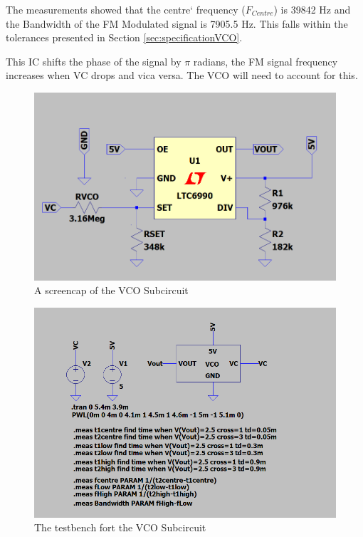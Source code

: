 The measurements showed that the centre` frequency ($F_{Centre}$) is 39842 Hz and the Bandwidth of the FM Modulated signal is 7905.5 Hz.
This falls within the tolerances presented in Section \ref{sec:specificationVCO}.

This IC shifts the phase of the signal by $\pi$ radians, the FM signal frequency increases when VC drops and vica versa. 
The VCO will need to account for this. 

\begin{figure}[H]
    \centering 
    \includegraphics[width=\textwidth]{../Circuits/Images/VCO/Schematic}
    \caption{A screencap of the VCO Subcircuit}
    \label{fig:VCOSchematic}
\end{figure}

\begin{figure}[H]
    \centering 
    \includegraphics[width=\textwidth]{../Circuits/Images/VCO/TestBenchScreencap}
    \caption{The testbench fort the VCO Subcircuit}
    \label{fig:VCOTestBench}
\end{figure}

